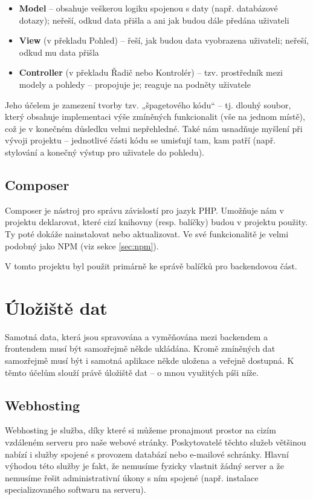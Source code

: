 		\begin{itemize}
			\item \textbf{Model} – obsahuje veškerou logiku spojenou s daty (např. databázové dotazy); neřeší, odkud data přišla a ani jak budou dále předána uživateli
			\item \textbf{View} (v překladu Pohled) – řeší, jak budou data vyobrazena uživateli; neřeší, odkud mu data přišla
			\item \textbf{Controller} (v překladu Řadič nebo Kontrolér) – tzv. prostředník mezi modely a pohledy – propojuje je; reaguje na podněty uživatele
		\end{itemize}
	
		Jeho účelem je zamezení tvorby tzv. „špagetového kódu“ – tj. dlouhý soubor, který obsahuje implementaci výše zmíněných funkcionalit (vše na jednom místě), což je v konečném důsledku velmi nepřehledné. Také nám usnadňuje myšlení při vývoji projektu – jednotlivé části kódu se umisťují tam, kam patří (např. stylování a konečný výstup pro uživatele do pohledu). \cite{MVC}
		
	\subsection{Composer}\label{sec:composer}
	Composer je nástroj pro správu závislostí pro jazyk PHP. Umožňuje nám v projektu deklarovat, které cizí knihovny (resp. balíčky) budou v projektu použity. Ty poté dokáže nainstalovat nebo aktualizovat. Ve své funkcionalitě je velmi podobný jako NPM (viz sekce \ref{sec:npm}). \cite{Composer}
	
	V tomto projektu byl použit primárně ke správě balíčků pro backendovou část.
		
\section{Úložiště dat}
Samotná data, která jsou spravována a vyměňována mezi backendem a frontendem musí být samozřejmě někde ukládána. Kromě zmíněných dat samozřejmě musí být i samotná aplikace někde uložena a veřejně dostupná. K těmto účelům slouží právě úložiště dat – o mnou využitých píši níže.

	\subsection{Webhosting}
	Webhosting je služba, díky které si můžeme pronajmout prostor na cizím vzdáleném serveru pro naše webové stránky. Poskytovatelé těchto služeb většinou nabízí i služby spojené s provozem databází nebo e-mailové schránky. Hlavní výhodou této služby je fakt, že nemusíme fyzicky vlastnit žádný server a že nemusíme řešit administrativní úkony s ním spojené (např. instalace specializovaného softwaru na serveru). \cite{Webhosting}
	
